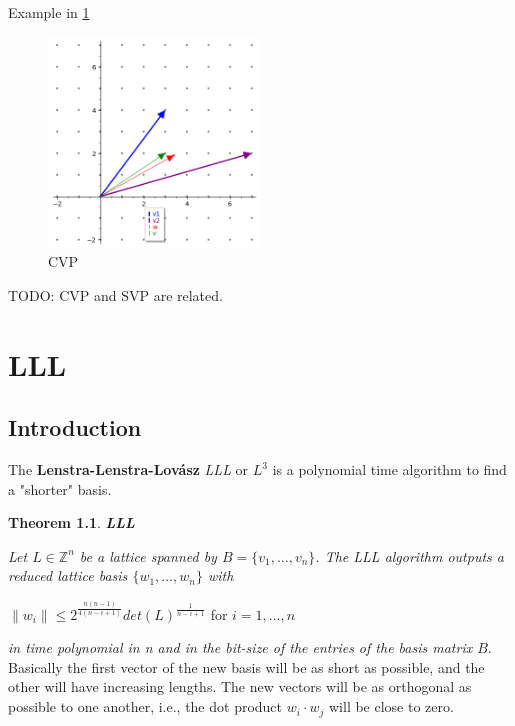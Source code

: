\documentclass[a4paper,12pt]{report}
\newtheorem{theorem}{Theorem}[section]
\newcommand{\Z}{\mathbb{Z}}
\newcommand{\dd}{\cdot}
\begin{document}
Example in \ref{fig:cvp}

\begin{figure}[t]
    \centering
    \includegraphics[width=0.5\textwidth]{./img/cvp.png}
    \caption{CVP}
    \label{fig:cvp}
\end{figure}

TODO: CVP and SVP are related.

\chapter{LLL}

\section{Introduction}

The \textbf{Lenstra-Lenstra-Lovász} \textit{LLL} or \textit{$L^3$} is a polynomial time algorithm to find a "shorter" basis.

\begin{theorem}
    \textbf{LLL}
\end{theorem}

\textit{Let $L \in \Z^n$ be a lattice spanned by $B = \{v_1,\ldots,v_n\}$. The LLL algorithm outputs a reduced lattice
basis $\{w_1, \ldots, w_n\}$ with}

\begin{center}
    $\lVert w_i \rVert \le 2^{\frac{n(n-1)}{4(n-i+1)}} det(L)^{\frac{1}{n-i+1}}$ for $i=1,\ldots,n$
\end{center}

\textit{in time polynomial in n and in the bit-size of the entries of the basis matrix $B$}.\\

Basically the first vector of the new basis will be as short as possible, and the other will have increasing lengths. The new vectors
will be as orthogonal as possible to one another, i.e., the dot product $w_i \dd w_j$ will be close to zero.
\end{document}
